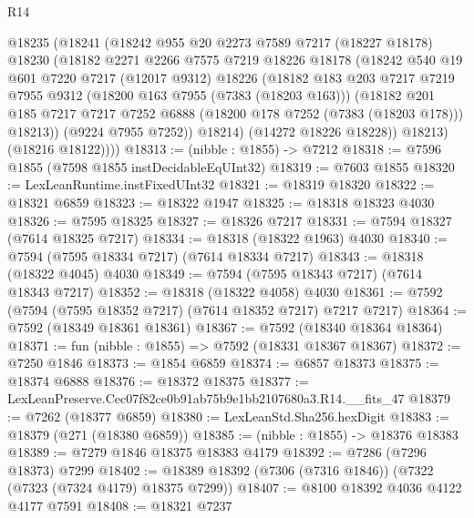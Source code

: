 \begin{lexlean}{R14}
\begin{coremodule}
        @18235
          (@18241
            (@18242
              @955
              @20
              @2273
              @7589
              @7217
              (@18227 @18178)
              @18230
              (@18182
                @2271
                @2266
                @7575
                @7219
                @18226
                @18178
                (@18242
                  @540
                  @19
                  @601
                  @7220
                  @7217
                  (@12017 @9312)
                  @18226
                  (@18182
                    @183
                    @203
                    @7217
                    @7219
                    @7955
                    @9312
                    (@18200 @163 @7955 (@7383 (@18203 @163)))
                    (@18182
                      @201
                      @185
                      @7217
                      @7217
                      @7252
                      @6888
                      (@18200 @178 @7252 (@7383 (@18203 @178)))
                      @18213))
                  (@9224 @7955 @7252))
                @18214)
              (@14272 @18226 @18228))
            @18213)
          (@18216 @18122))))
@18313 := (nibble : @1855) -> @7212
@18318 := @7596 @1855 (@7598 @1855 instDecidableEqUInt32)
@18319 := @7603 @1855
@18320 := LexLeanRuntime.instFixedUInt32
@18321 := @18319 @18320
@18322 := @18321 @6859
@18323 := @18322 @1947
@18325 := @18318 @18323 @4030
@18326 := @7595 @18325
@18327 := @18326 @7217
@18331 := @7594 @18327 (@7614 @18325 @7217)
@18334 := @18318 (@18322 @1963) @4030
@18340 := @7594 (@7595 @18334 @7217) (@7614 @18334 @7217)
@18343 := @18318 (@18322 @4045) @4030
@18349 := @7594 (@7595 @18343 @7217) (@7614 @18343 @7217)
@18352 := @18318 (@18322 @4058) @4030
@18361 := @7592 (@7594 (@7595 @18352 @7217) (@7614 @18352 @7217) @7217 @7217)
@18364 := @7592 (@18349 @18361 @18361)
@18367 := @7592 (@18340 @18364 @18364)
@18371 := fun (nibble : @1855) => @7592 (@18331 @18367 @18367)
@18372 := @7250 @1846
@18373 := @1854 @6859
@18374 := @6857 @18373
@18375 := @18374 @6888
@18376 := @18372 @18375
@18377 := LexLeanPreserve.Cec07f82ce0b91ab75b9e1bb2107680a3.R14.__fits_47
@18379 := @7262 (@18377 @6859)
@18380 := LexLeanStd.Sha256.hexDigit
@18383 := @18379 (@271 (@18380 @6859))
@18385 := (nibble : @1855) -> @18376 @18383
@18389 := @7279 @1846 @18375 @18383 @4179
@18392 := @7286 (@7296 @18373) @7299
@18402 := @18389 @18392 (@7306 (@7316 @1846)) (@7322 (@7323 (@7324 @4179) @18375 @7299))
@18407 := @8100 @18392 @4036 @4122 @4177 @7591
@18408 := @18321 @7237

\end{coremodule}
\end{lexlean}
